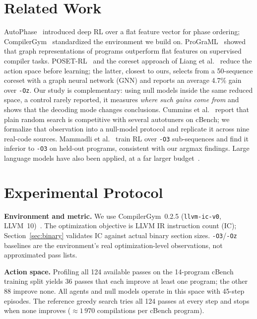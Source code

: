 \documentclass[conference,a4paper]{IEEEtran}
\begin{document}
\section{Related Work}
AutoPhase~\cite{autophase} introduced deep RL over a flat feature vector
for phase ordering; CompilerGym~\cite{compilergym} standardized the
environment we build on. ProGraML~\cite{programl} showed that graph
representations of programs outperform flat features on supervised
compiler tasks. POSET-RL~\cite{posetrl}
and the coreset approach of Liang et al.~\cite{coreset} reduce the
action space before learning; the latter, closest to ours, selects from a 50-sequence coreset with
a graph neural network (GNN) and reports an average 4.7\% gain over
\texttt{-Oz}. Our study is complementary: using null models inside the
same reduced space, a control rarely reported, it measures \emph{where
such gains come from} and shows that the decoding mode changes
conclusions. Cummins et al.~\cite{compilergym} report that plain random
search is competitive with several autotuners on cBench; we formalize
that observation into a null-model protocol and replicate it across
nine real-code sources. Mammadli et al.~\cite{mammadli} train RL
over \texttt{-O3} sub-sequences and find it inferior to \texttt{-O3} on
held-out programs, consistent with our argmax findings. Large language
models have also been applied, at a far larger budget~\cite{llmcompiler}.

\section{Experimental Protocol}
\textbf{Environment and metric.} We use CompilerGym~0.2.5
(\texttt{llvm-ic-v0}, LLVM~10)~\cite{compilergym}. The optimization
objective is LLVM IR instruction count (IC); Section~\ref{sec:binary}
validates IC against actual binary section sizes.
\texttt{-O3}/\texttt{-Oz} baselines are the environment's real
optimization-level observations, not approximated pass lists.

\textbf{Action space.} Profiling all 124 available passes on the
14-program cBench training split yields 36 passes that each improve at
least one program; the other 88 improve none.
All agents and null models operate in this space with 45-step
episodes. The reference greedy search tries all 124 passes at every
step and stops when none improves (${\approx}1\,970$ compilations per
cBench program).
\end{document}
